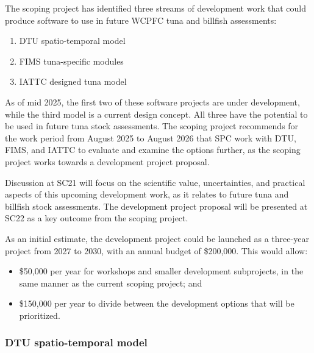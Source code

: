\documentclass{SCreport}
\begin{document}
\vspace{2ex}

The scoping project has identified three streams of development work that could
produce software to use in future WCPFC tuna and billfish assessments:

\begin{enumerate}
  \item DTU spatio-temporal model\\[-4.5ex]
  \item FIMS tuna-specific modules\\[-4.5ex]
  \item IATTC designed tuna model
\end{enumerate}

As of mid 2025, the first two of these software projects are under development,
while the third model is a current design concept. All three have the potential
to be used in future tuna stock assessments. The scoping project recommends for
the work period from August 2025 to August 2026 that SPC work with DTU, FIMS,
and IATTC to evaluate and examine the options further, as the scoping project
works towards a development project proposal.

Discussion at SC21 will focus on the scientific value, uncertainties, and
practical aspects of this upcoming development work, as it relates to future
tuna and billfish stock assessments. The development project proposal will be
presented at SC22 as a key outcome from the scoping project.

As an initial estimate, the development project could be launched as a
three-year project from 2027 to 2030, with an annual budget of \$200,000. This
would allow:

\begin{itemize}
  \item \$50,000 per year for workshops and smaller development subprojects, in
  the same manner as the current scoping project; and
  \item \$150,000 per year to divide between the development options that will
  be prioritized.
\end{itemize}

\vspace{2ex}

\subsubsection{DTU spatio-temporal model}
\label{sec:dtu-development-project}
\end{document}
